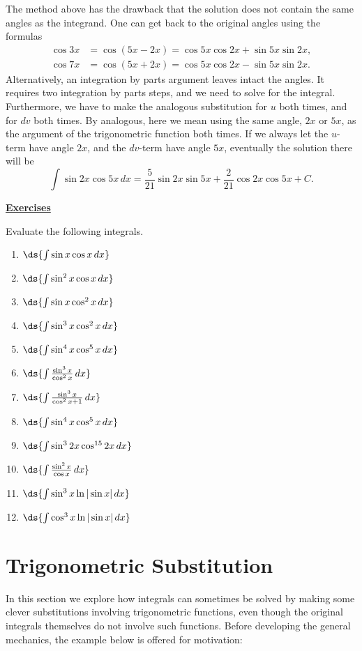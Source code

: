 The method above has the drawback that the solution does not
contain the same angles as the integrand. One can
get back to the original angles using the formulas
\begin{align*}
\cos3x&=\cos(5x-2x)=\cos5x\cos2x+\sin5x\sin2x,\\
\cos7x&=\cos(5x+2x)=\cos5x\cos2x-\sin5x\sin2x.\end{align*}
Alternatively, an integration by parts argument leaves intact
the angles.  It requires two integration by parts steps,
and we need to solve for the integral.  Furthermore, 
we have to make the analogous substitution for $u$ both
times, and for $dv$ both times.  By analogous, here
we mean using the same angle, $2x$ or $5x$, as the argument
of the trigonometric function both times.
If we always let the $u$-term have angle $2x$,
and the $dv$-term have angle $5x$, 
eventually the solution there will be
$$\int\sin2x\cos5x\,dx
  =\frac5{21}\sin2x\sin5x+\frac2{21}\cos2x\cos5x+C.$$
\newpage
\begin{center}
\underline{\Large{\bf Exercises}}\end{center}

\begin{multicols}{2}
Evaluate the following integrals.
\begin{enumerate}
\item $\ds{\int\sin x\cos x\,dx}$
\item $\ds{\int\sin^2x\cos x\,dx}$
\item $\ds{\int\sin x\cos^2x\,dx}$
\item $\ds{\int\sin^3x\cos^2x\,dx}$
\item $\ds{\int\sin^4x\cos^5x\,dx}$
\item $\ds{\int\frac{\sin^3x}{\cos^2x}\,dx}$
\item $\ds{\int\frac{\sin^3x}{\cos^2x+1}\,dx}$
\item $\ds{\int \sin^4x\cos^5x\,dx}$
\item $\ds{\int\sin^32x\cos^{15}2x\,dx}$
\item $\ds{\int\frac{\sin^2x}{\cos x}\,dx}$




\item $\ds{\int\sin^3x\ln|\sin x|\,dx}$
\item $\ds{\int\cos^3x\ln|\sin x|\,dx}$
\end{enumerate}
\end{multicols}


\newpage
\section{Trigonometric Substitution\label{TrigSubSection}}
In this section we explore how integrals can sometimes be
solved by making some clever substitutions involving
trigonometric functions, even though the original integrals
themselves do not involve such functions.  
Before developing the general mechanics, the example below
is offered for motivation:

